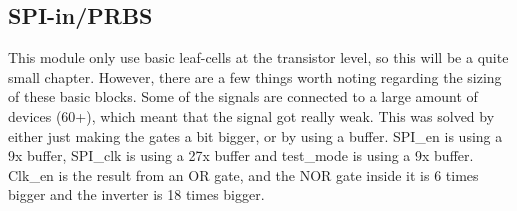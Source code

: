 
\subsection{SPI-in/PRBS}
This module only use basic leaf-cells at the transistor level, so this will be a quite small chapter. However, there are a few things worth noting regarding the sizing of these basic blocks. Some of the signals are connected to a large amount of devices (60+), which meant that the signal got really weak. This was solved by either just making the gates a bit bigger, or by using a buffer. SPI\_en is using a 9x buffer, SPI\_clk is using a 27x buffer and test\_mode is using a 9x buffer. Clk\_en is the result from an OR gate, and the NOR gate inside it is 6 times bigger and the inverter is 18 times bigger.

